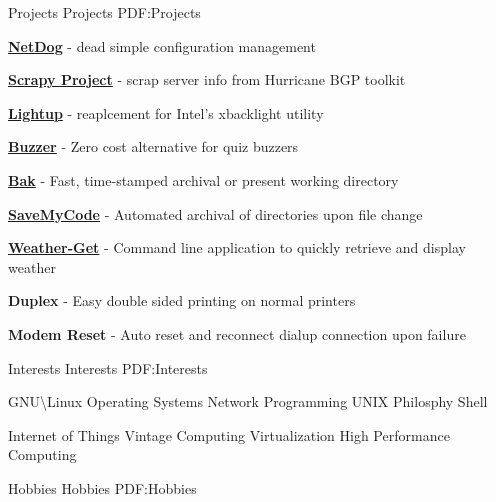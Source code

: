 \documentclass[letterpaper,MMMyyyy,nonstopmode]{simpleresumecv}
\begin{document}
\begin{Body}
\endgroup


\BigGap
\Section
{Projects}
{Projects}
{PDF:Projects}

\BulletItem
\href{https://github.com/karuvally/project_green}
{\textbf{NetDog}} - dead simple configuration management
\hfill
{}

\BigGap
\BulletItem
\href{https://github.com/karuvally/scrapy_project}
{\textbf{Scrapy Project}} - scrap server info from Hurricane BGP toolkit
\hfill
{}

\BigGap
\BulletItem
\href{https://github.com/karuvally/lightup}
{\textbf{Lightup}} - reaplcement for Intel's xbacklight utility
\hfill
{}

\BigGap
\BulletItem
\href{https://github.com/karuvally/buzzer}
{\textbf{Buzzer}} - Zero cost alternative for quiz buzzers
\hfill
{}

\BigGap
\BulletItem
\href{https://github.com/karuvally/bak}
{\textbf{Bak}} - Fast, time-stamped archival or present working directory
\hfill
{}

\BigGap
\BulletItem
\href{https://github.com/karuvally/SaveMyCode}
{\textbf{SaveMyCode}} - Automated archival of directories upon file change
\hfill
{}

\BigGap
\BulletItem
\href{https://github.com/karuvally/weather-get}
{\textbf{Weather-Get}} - Command line application to quickly retrieve and display
weather
\hfill
{}

\BigGap
\BulletItem
{\textbf{Duplex}} - Easy double sided printing on normal printers
\hfill
{}

\BigGap
\BulletItem
{\textbf{Modem Reset}} - Auto reset and reconnect dialup connection upon failure
\hfill
{}


\BigGap
\Section
{Interests}
{Interests}
{PDF:Interests}

\Entry
GNU\textbackslash Linux \textbullet{} Operating Systems \textbullet{}
Network Programming \textbullet{} UNIX Philosphy \textbullet{} Shell

\Gap
\Entry
Internet of Things \textbullet{} Vintage Computing \textbullet{}
Virtualization \textbullet{} High Performance Computing


\BigGap
\Section
{Hobbies}
{Hobbies}
{PDF:Hobbies}


\end{Body}
\end{document}
